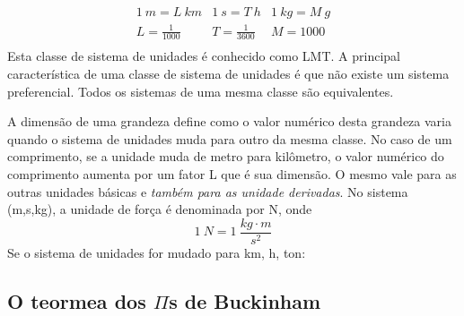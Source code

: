 \[
\begin{matrix}
  1\:m = L\:km & 1\:s = T\:h & 1\:kg = M\:g\\
  L=\frac{1}{1000} & T = \frac{1}{3600} & M = 1000\\
\end{matrix}
\]
Esta classe de sistema de unidades é conhecido como LMT. A principal característica de uma classe de sistema de unidades é que não existe um sistema preferencial. Todos os sistemas de uma mesma classe são equivalentes.

A dimensão de uma grandeza define como o valor numérico desta grandeza varia quando o sistema de unidades muda para outro da mesma classe. No caso de um comprimento, se a unidade muda de metro para kilômetro, o valor numérico do comprimento aumenta por um fator L que é sua dimensão. O mesmo vale para as outras unidades básicas e \emph{também para as unidade derivadas}. No sistema (m,s,kg), a unidade de força é denominada por N, onde
\[
1\:N = 1\:\frac{kg\cdot m}{s^2}
\]
Se o sistema de unidades for mudado para km, h, ton: 


\subsection{O teormea dos $\Pi$s de Buckinham}
